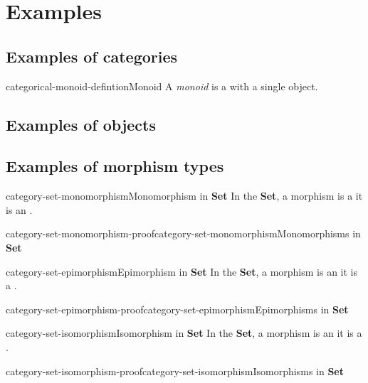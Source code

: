 \documentclass[preview]{standalone}
\begin{document}
\genpage

\section{Examples}

\subsection{Examples of categories}

\begin{snippetdefinition}{categorical-monoid-defintion}{Monoid}
    A \textit{monoid} is a \category with a single object.
\end{snippetdefinition}


\subsection{Examples of objects}

\subsection{Examples of morphism types}

\begin{snippetproposition}{category-set-monomorphism}{Monomorphism in \textbf{Set}}
    In the \category \textbf{Set}, a morphism is a
    \monomorphism \ifandonlyif it is an \injective \function.
\end{snippetproposition}

\begin{snippetproof}{category-set-monomorphism-proof}{category-set-monomorphism}{Monomorphisms in \textbf{Set}}
    \todo %
\end{snippetproof}

\begin{snippetproposition}{category-set-epimorphism}{Epimorphism in \textbf{Set}}
    In the \category \textbf{Set}, a morphism is an
    \epimorphism \ifandonlyif it is a \surjective \function.
\end{snippetproposition}

\begin{snippetproof}{category-set-epimorphism-proof}{category-set-epimorphism}{Epimorphisms in \textbf{Set}}
    \todo
\end{snippetproof}

\begin{snippetproposition}{category-set-isomorphism}{Isomorphism in \textbf{Set}}
    In the \category \textbf{Set}, a morphism is an
    \catisomorphism \ifandonlyif it is a \bijective \function.
\end{snippetproposition}

\begin{snippetproof}{category-set-isomorphism-proof}{category-set-isomorphism}{Isomorphisms in \textbf{Set}}
    \todo
\end{snippetproof}
\end{document}
